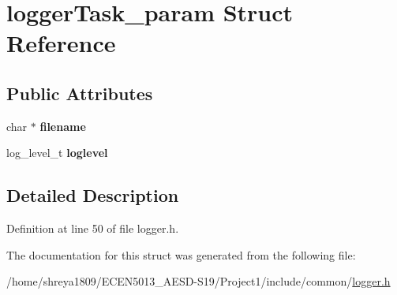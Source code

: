 \hypertarget{structloggerTask__param}{}\section{logger\+Task\+\_\+param Struct Reference}
\label{structloggerTask__param}
\subsection*{Public Attributes}
\begin{DoxyCompactItemize}
\item 
\mbox{\label{structloggerTask__param_aea04d7d9c5f62c2986470ba7e8028a89}} 
char $\ast$ {\bfseries filename}
\item 
\mbox{\label{structloggerTask__param_a00b4463ec089cbba3cfb67bfa224b777}} 
log\+\_\+level\+\_\+t {\bfseries loglevel}
\end{DoxyCompactItemize}


\subsection{Detailed Description}


Definition at line 50 of file logger.\+h.



The documentation for this struct was generated from the following file\+:\begin{DoxyCompactItemize}
\item 
/home/shreya1809/\+E\+C\+E\+N5013\+\_\+\+A\+E\+S\+D-\/\+S19/\+Project1/include/common/\hyperlink{logger_8h}{logger.\+h}\end{DoxyCompactItemize}
